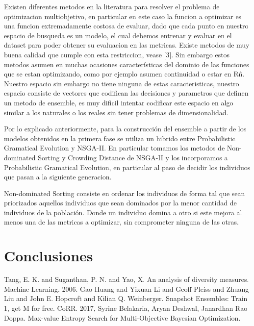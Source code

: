 \documentclass[runningheads,a4paper]{llncs}
\begin{document}
    Existen diferentes metodos en la literatura para resolver el problema de optimizacion multiobjetivo,
    en particular en este caso la funcion a optimizar es una funcion extremadamente costosa de evaluar,
    dado que cada punto en nuestro espacio de busqueda es un modelo, el cual debemos entrenar y evaluar
    en el dataset para poder obtener su evaluacion en las metricas. Existe metodos de muy buena calidad
    que cumple con esta restriccion, vease [3]. Sin embargo estos metodos asumen en muchas ocasiones
    características del dominio de las funciones que se estan optimizando, como por ejemplo asumen
    continuidad o estar en R\^n. Nuestro espacio sin embargo no tiene ninguna de estas caracteristicas,
    nuestro espacio consiste de vectores que codifican las decisiones y parametros que definen un metodo de
    ensemble, es muy dificil intentar codificar este espacio en algo similar a los naturales o los reales
    sin tener problemas de dimensionalidad.
	
	Por lo explicado anteriormente, para la construcción del ensemble a partir de los modelos obtenidos
    en la primera fase se utiliza un hibrido entre Probabilistic Gramatical Evolution y NSGA-II. En
    particular tomamos los metodos de Non-dominated Sorting y Crowding Distance de NSGA-II y los
    incorporamos a Probabilistic Gramatical Evolution, en particular al paso de decidir los individuos
    que pasan a la siguiente generacion.
	
	Non-dominated Sorting consiste en ordenar los individuos de forma tal que sean priorizados aquellos
	individuos que sean dominados por la menor cantidad de individuos de la población. Donde un individuo
	domina a otro si este mejora al menos una de las metricas a optimizar, sin comprometer ninguna de las
	otras.
	
	\section*{Conclusiones}
	
	
	\begin{thebibliography}{4}
		
		 Tang, E. K. and Suganthan, P. N. and Yao, X. An analysis of diversity measures. Machine Learning. 2006.
		 Gao Huang and Yixuan Li and Geoff Pleiss and Zhuang Liu and John E. Hopcroft and Kilian Q. Weinberger. Snapshot Ensembles: Train 1, get {M} for free. CoRR. 2017,
         Syrine Belakaria, Aryan Deshwal, Janardhan Rao Doppa. Max-value Entropy Search for Multi-Objective Bayesian Optimization.
		
	\end{thebibliography}
	
	
\end{document}
